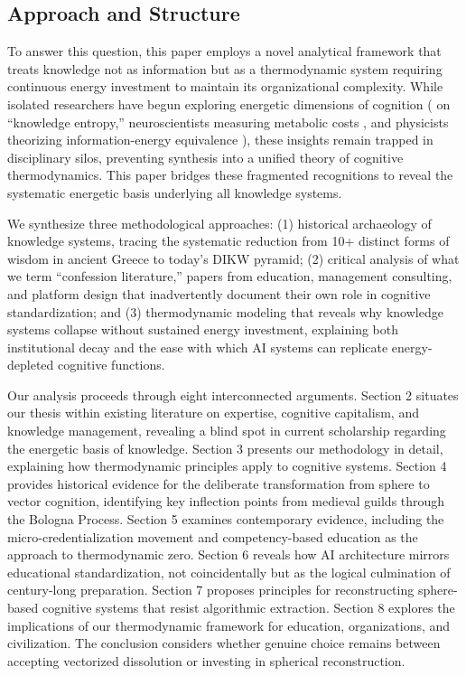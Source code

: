 \subsection{Approach and Structure}

To answer this question, this paper employs a novel analytical framework that treats knowledge not as information but as a thermodynamic system requiring continuous energy investment to maintain its organizational complexity. While isolated researchers have begun exploring energetic dimensions of cognition (\citet{bratianu2020} on ``knowledge entropy,'' neuroscientists measuring metabolic costs \citep{jamadar2025}, and physicists theorizing information-energy equivalence \citep{stonier1996}), these insights remain trapped in disciplinary silos, preventing synthesis into a unified theory of cognitive thermodynamics. This paper bridges these fragmented recognitions to reveal the systematic energetic basis underlying all knowledge systems.

We synthesize three methodological approaches: (1) historical archaeology of knowledge systems, tracing the systematic reduction from 10+ distinct forms of wisdom in ancient Greece to today's DIKW pyramid; (2) critical analysis of what we term ``confession literature,'' papers from education, management consulting, and platform design that inadvertently document their own role in cognitive standardization; and (3) thermodynamic modeling that reveals why knowledge systems collapse without sustained energy investment, explaining both institutional decay and the ease with which AI systems can replicate energy-depleted cognitive functions.

Our analysis proceeds through eight interconnected arguments. Section 2 situates our thesis within existing literature on expertise, cognitive capitalism, and knowledge management, revealing a blind spot in current scholarship regarding the energetic basis of knowledge. Section 3 presents our methodology in detail, explaining how thermodynamic principles apply to cognitive systems. Section 4 provides historical evidence for the deliberate transformation from sphere to vector cognition, identifying key inflection points from medieval guilds through the Bologna Process. Section 5 examines contemporary evidence, including the micro-credentialization movement and competency-based education as the approach to thermodynamic zero. Section 6 reveals how AI architecture mirrors educational standardization, not coincidentally but as the logical culmination of century-long preparation. Section 7 proposes principles for reconstructing sphere-based cognitive systems that resist algorithmic extraction. Section 8 explores the implications of our thermodynamic framework for education, organizations, and civilization. The conclusion considers whether genuine choice remains between accepting vectorized dissolution or investing in spherical reconstruction.

